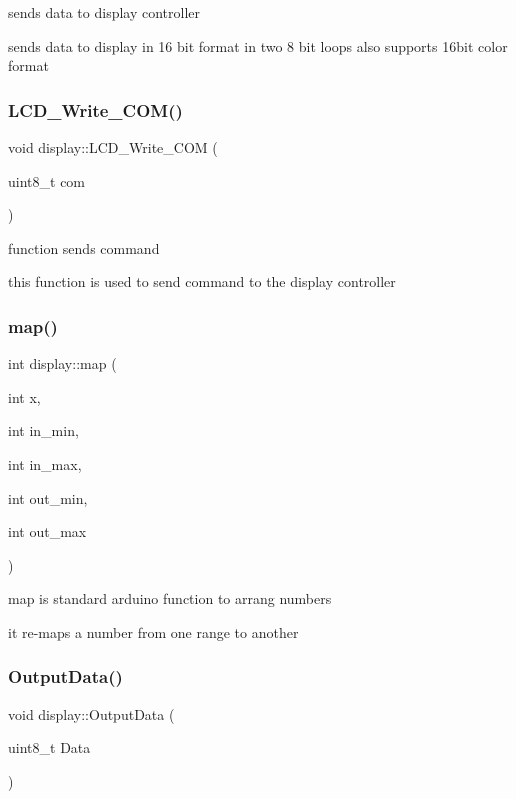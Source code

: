 sends data to display controller 

sends data to display in 16 bit format in two 8 bit loops also supports 16bit color format \mbox{\label{classdisplay_a1975e05bb65cbfcf209ace9dbea7d660}} 
\subsubsection{\texorpdfstring{L\+C\+D\+\_\+\+Write\+\_\+\+C\+O\+M()}{LCD\_Write\_COM()}}
{\footnotesize\ttfamily void display\+::\+L\+C\+D\+\_\+\+Write\+\_\+\+C\+OM (\begin{DoxyParamCaption}\item[{uint8\+\_\+t}]{com }\end{DoxyParamCaption})}



function sends command 

this function is used to send command to the display controller \mbox{\label{classdisplay_aa25dc0f889ff19b65c51fe6b94872398}} 
\subsubsection{\texorpdfstring{map()}{map()}}
{\footnotesize\ttfamily int display\+::map (\begin{DoxyParamCaption}\item[{int}]{x,  }\item[{int}]{in\+\_\+min,  }\item[{int}]{in\+\_\+max,  }\item[{int}]{out\+\_\+min,  }\item[{int}]{out\+\_\+max }\end{DoxyParamCaption})}



map is standard arduino function to arrang numbers 

it re-\/maps a number from one range to another \mbox{\label{classdisplay_a3da84c7e17070441111af326cc03217a}} 
\subsubsection{\texorpdfstring{Output\+Data()}{OutputData()}}
{\footnotesize\ttfamily void display\+::\+Output\+Data (\begin{DoxyParamCaption}\item[{uint8\+\_\+t}]{Data }\end{DoxyParamCaption})}



